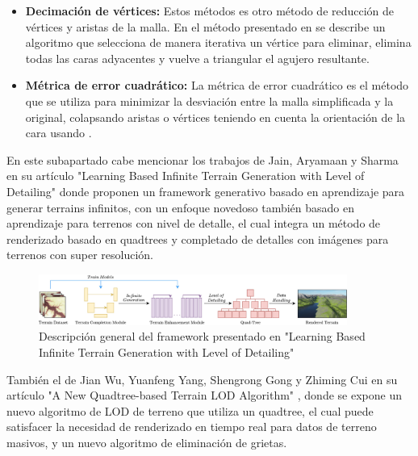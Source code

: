 \begin{itemize}
                    \item \textbf{Decimación de vértices: }Estos métodos es otro método de reducción de vértices y aristas de la malla. En el método presentado en \cite{Schroeder1992} se describe un algoritmo que selecciona de manera iterativa un vértice para eliminar, elimina todas las caras adyacentes y vuelve a triangular el agujero resultante.
                    \item \textbf{Métrica de error cuadrático: }La métrica de error cuadrático es el método que se utiliza para minimizar la desviación entre la malla simplificada y la original, colapsando aristas o vértices teniendo en cuenta la orientación de la cara usando \cite{linkedinmeshsimplification}.
                \end{itemize}

            En este subapartado cabe mencionar los trabajos de Jain, Aryamaan y Sharma en su artículo "Learning Based Infinite Terrain Generation with Level of Detailing" \cite{Jain2022} donde proponen un framework generativo basado en aprendizaje para generar terrains infinitos, con un enfoque novedoso también basado en aprendizaje para terrenos con nivel de detalle, el cual integra un método de renderizado basado en quadtrees y completado de detalles con imágenes para terrenos con super resolución.
            \begin{figure}[h]
                \centering
                \includegraphics[width=0.9\textwidth]{img/framework-overview.png}
                \caption{Descripción general del framework presentado en "Learning Based Infinite Terrain Generation with Level of Detailing"\cite{Jain2022}}
            \end{figure}

            También el de Jian Wu, Yuanfeng Yang, Shengrong Gong y Zhiming Cui en su artículo "A New Quadtree-based Terrain LOD Algorithm" \cite{Wu2010ANQ}, donde se expone un nuevo algoritmo de LOD de terreno que utiliza un quadtree, el cual puede satisfacer la necesidad de renderizado en tiempo real para datos de terreno masivos, y un nuevo algoritmo de eliminación de grietas.
            
